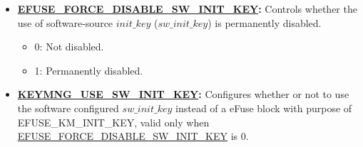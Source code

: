\documentclass[main\_\_EN.tex]{subfiles}
\begin{document}
\begin{enumerate}
\begin{itemize}
\begin{itemize}
\begin{itemize}
                \end{itemize}
            \item \textbf{Bit[2]:} Configures whether HMAC key comes from eFuse block.
                \begin{itemize}
                    \item 0: No effect.
                    \item 1: Flash key comes from eFuse block, valid only when bit[2] in \hyperref[fielddesc:EFUSEFORCEUSEKEYMANAGERKEY]{EFUSE\_FORCE\_USE\_KEY\_MANAGER\_KEY} is 0.
                \end{itemize}
            \item \textbf{Bit[3]:} Configures whether RSA\_DS\_KEY comes from eFuse block.
                \begin{itemize}
                    \item 0: No effect.
                    \item 1: RSA\_DS\_KEY comes from eFuse block, valid only when bit[1] in \hyperref[fielddesc:EFUSEFORCEUSEKEYMANAGERKEY]{EFUSE\_FORCE\_USE\_KEY\_MANAGER\_KEY} is 0.
                \end{itemize}
            \item \textbf{Bit[4]:} Configures whether PSRAM key comes from eFuse block.
                \begin{itemize}
                    \item 0: No effect.
                    \item 1: PSRAM key comes from eFuse block, valid only when bit[4] in \hyperref[fielddesc:EFUSEFORCEUSEKEYMANAGERKEY]{EFUSE\_FORCE\_USE\_KEY\_MANAGER\_KEY} is 0.
                \end{itemize}
        \end{itemize}
        \item \textbf{\hyperref[fielddesc:EFUSEFORCEDISABLESWINITKEY]{EFUSE\_FORCE\_DISABLE\_SW\_INIT\_KEY}:} Controls whether the use of software-source \begin{math}init\_key\end{math} (\begin{math}sw\_init\_key\end{math}) is permanently disabled.
        \begin{itemize}
            \item 0: Not disabled.
            \item 1: Permanently disabled.
        \end{itemize}
        \item \textbf{\hyperref[fielddesc:KEYMNGUSESWINITKEY]{KEYMNG\_USE\_SW\_INIT\_KEY}:} Configures whether or not to use the software configured \begin{math}sw\_init\_key\end{math} instead of a eFuse block with purpose of EFUSE\_KM\_INIT\_KEY, valid only when \hyperref[fielddesc:EFUSEFORCEDISABLESWINITKEY]{EFUSE\_FORCE\_DISABLE\_SW\_INIT\_KEY} is 0.

\end{itemize}
\end{enumerate}
\end{document}
